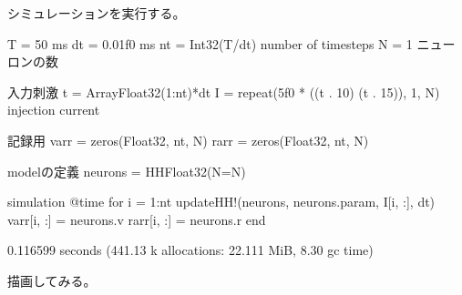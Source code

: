 \documentclass[letterpaper,10pt,english]{sphinxmanual}
\begin{document}
シミュレーションを実行する。

\begin{sphinxVerbatim}[commandchars=\\\{\}]
T = 50 \PYGZsh{} ms
dt = 0.01f0 \PYGZsh{} ms
nt = Int32(T/dt) \PYGZsh{} number of timesteps
N = 1 \PYGZsh{} ニューロンの数

\PYGZsh{} 入力刺激
t = Array\PYGZob{}Float32\PYGZcb{}(1:nt)*dt
I = repeat(5f0 * ((t .\PYGZgt{} 10) \PYGZhy{} (t .\PYGZgt{} 15)), 1, N)  \PYGZsh{} injection current

\PYGZsh{} 記録用
varr = zeros(Float32, nt, N)
rarr = zeros(Float32, nt, N)

\PYGZsh{} modelの定義
neurons = HH\PYGZob{}Float32\PYGZcb{}(N=N)

\PYGZsh{} simulation
@time for i = 1:nt
    updateHH!(neurons, neurons.param, I[i, :], dt)
    varr[i, :] = neurons.v
    rarr[i, :] = neurons.r
end
\end{sphinxVerbatim}

\begin{sphinxVerbatim}[commandchars=\\\{\}]
  0.116599 seconds (441.13 k allocations: 22.111 MiB, 8.30\PYGZpc{} gc time)
\end{sphinxVerbatim}

描画してみる。

\begin{sphinxVerbatim}[commandchars=\\\{\}]
   \PYG{p}{[} \PYG{p}{]}
   \PYG{p}{[} \PYG{p}{]}
   \PYG{p}{[} \PYG{p}{]}
   
      \PYG{p}{[}  \PYG{p}{]} 
     \PYG{p}{[}  \PYG{p}{]}
        \PYG{p}{[}  \PYG{p}{]}   
\end{sphinxVerbatim}
\end{document}
